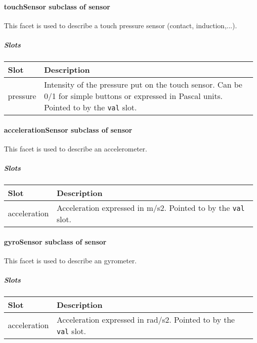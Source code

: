 \documentclass[a4paper]{article}
\begin{document}
\paragraph{ touchSensor  \textmd{subclass of sensor}}


This facet is used to describe a touch pressure sensor (contact,
induction,...).

\subparagraph{Slots}

\begin{flushleft}
\tablehead{}
\begin{supertabular}{|m{2.8669999cm}|m{12.422cm}|}
\hline
\sffamily\bfseries Slot &
\sffamily\bfseries Description\\\hline
pressure &
\sffamily Intensity of the pressure put on the
touch sensor. Can be 0/1 for simple buttons or expressed in Pascal
units. Pointed to by the \texttt{val} slot.\\\hline
\end{supertabular}
\end{flushleft}
\paragraph{ accelerationSensor  \textmd{subclass of sensor}}


This facet is used to describe an accelerometer.

\subparagraph{Slots}

\begin{flushleft}
\tablehead{}
\begin{supertabular}{|m{3.651cm}|m{11.639cm}|}
\hline
\sffamily\bfseries Slot &
\sffamily\bfseries Description\\\hline
acceleration &
\sffamily Acceleration expressed in m/s2.
Pointed to by the \texttt{val} slot.\\\hline
\end{supertabular}
\end{flushleft}
\paragraph{gyroSensor  \textmd{subclass of sensor}}


This facet is used to describe an gyrometer.

\subparagraph{Slots}

\begin{flushleft}
\tablehead{}
\begin{supertabular}{|m{3.651cm}|m{11.639cm}|}
\hline
\sffamily\bfseries Slot &
\sffamily\bfseries Description\\\hline
acceleration &
\sffamily Acceleration expressed in rad/s2.
Pointed to by the \texttt{val} slot.\\\hline
\end{supertabular}
\end{flushleft}
\end{document}
